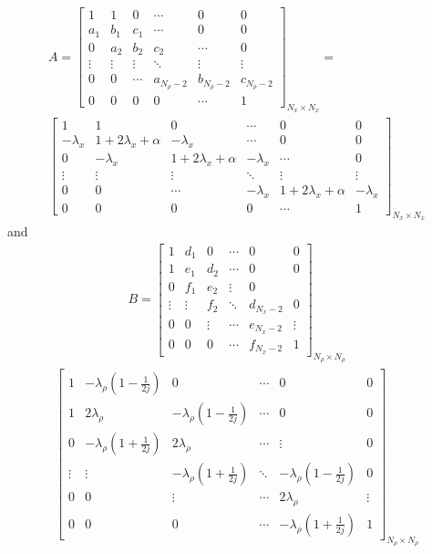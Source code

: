 \documentclass{article}
\begin{document}
\begin{gather}
A = 
\begin{bmatrix}
1 & 1 & 0 & \cdots & 0 & 0\\
a_1 & b_1 & c_1 & \cdots & 0 & 0 \\  
0 & a_2 & b_2 & c_2 &\cdots & 0 \\
\vdots & \vdots & \vdots & \ddots & \vdots & \vdots \\
0 & 0 & \cdots & a_{N_\rho-2} & b_{N_\rho-2} & c_{N_\rho-2}  \\
0 & 0 & 0 & 0 & \cdots & 1
\end{bmatrix}_{N_x\times N_x} = \\
\begin{bmatrix}
1 & 1 & 0 & \cdots & 0 & 0\\
-\lambda_x & 1+2\lambda_x+\alpha & -\lambda_x & \cdots & 0 & 0 \\  
0 & -\lambda_x &  1+2\lambda_x+\alpha & -\lambda_x &\cdots & 0 \\
\vdots & \vdots & \vdots & \ddots & \vdots & \vdots \\
0 & 0 & \cdots & -\lambda_x &  1+2\lambda_x+\alpha & -\lambda_x  \\
0 & 0 & 0 & 0 & \cdots & 1
\end{bmatrix}_{N_x\times N_x}
\end{gather}
and
\begin{gather}
B = 
\begin{bmatrix}
1 & d_1 & 0 & \cdots  & 0 & 0\\
1 & e_1  & d_2 & \cdots & 0 &0 \\  
0 & f_1 &  e_2 &\vdots & 0 \\
\vdots & \vdots & f_2 & \ddots & d_{N_x-2} & 0 \\
0 & 0 & \vdots & \cdots &  e_{N_x-2} & \vdots  \\
0 & 0 & 0 & \cdots &  f_{N_x-2} & 1
\end{bmatrix}_{N_{\rho}\times N_{\rho}}
\end{gather}
\begin{gather}
\begin{bmatrix}
1 & -\lambda_\rho(1-\frac{1}{2j}) & 0 & \cdots  & 0 & 0\\
1 & 2\lambda_\rho  & -\lambda_\rho(1-\frac{1}{2j}) & \cdots & 0 &0 \\  
0 & -\lambda_\rho(1+\frac{1}{2j}) &  2\lambda_\rho & \cdots &\vdots & 0 \\
\vdots & \vdots & -\lambda_\rho(1+\frac{1}{2j}) & \ddots & -\lambda_\rho(1-\frac{1}{2j}) & 0 \\
0 & 0 & \vdots & \cdots &  2\lambda_\rho & \vdots  \\
0 & 0 & 0 & \cdots & -\lambda_\rho(1+\frac{1}{2j}) & 1
\end{bmatrix}_{N_{\rho}\times N_{\rho}}
\end{gather}
\end{document}

